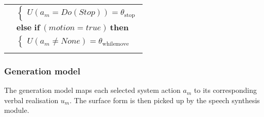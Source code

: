 \begin{footnotesize}
\begin{longtable}{p{2cm}l}
& \;\;\;\;\; $ \begin{cases}U(\mathit{a_m}\!=\!\mathit{Do(Stop)})\!=\!\theta_{\mathrm{stop}} \end{cases}$\\[3mm] & $ \textbf{else if} \ (\mathit{motion}\!=\!\mathit{true}) \ \textbf{then}$ \\
& \;\;\;\;\; $ \begin{cases}U(\mathit{a_m}\!\neq\!\mathit{None})\!=\!\theta_{\mathrm{whilemove}} \end{cases}$ \\ \\[-2mm]
\end{longtable}
\end{footnotesize}

\subsubsection*{Generation model}

The generation model maps each selected system action $a_m$ to its corresponding verbal realisation $u_m$.  The surface form is then picked up by the speech synthesis module.
 

